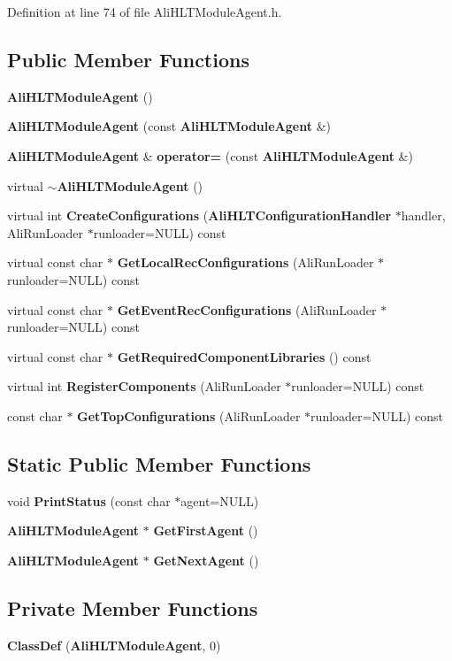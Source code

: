 Definition at line 74 of file Ali\-HLTModule\-Agent.h.\subsection*{Public Member Functions}
\begin{CompactItemize}
\item 
{\bf Ali\-HLTModule\-Agent} ()
\item 
{\bf Ali\-HLTModule\-Agent} (const {\bf Ali\-HLTModule\-Agent} \&)
\item 
{\bf Ali\-HLTModule\-Agent} \& {\bf operator=} (const {\bf Ali\-HLTModule\-Agent} \&)
\item 
virtual {\bf $\sim$Ali\-HLTModule\-Agent} ()
\item 
virtual int {\bf Create\-Configurations} ({\bf Ali\-HLTConfiguration\-Handler} $\ast$handler, Ali\-Run\-Loader $\ast$runloader=NULL) const 
\item 
virtual const char $\ast$ {\bf Get\-Local\-Rec\-Configurations} (Ali\-Run\-Loader $\ast$runloader=NULL) const 
\item 
virtual const char $\ast$ {\bf Get\-Event\-Rec\-Configurations} (Ali\-Run\-Loader $\ast$runloader=NULL) const 
\item 
virtual const char $\ast$ {\bf Get\-Required\-Component\-Libraries} () const 
\item 
virtual int {\bf Register\-Components} (Ali\-Run\-Loader $\ast$runloader=NULL) const 
\item 
const char $\ast$ {\bf Get\-Top\-Configurations} (Ali\-Run\-Loader $\ast$runloader=NULL) const 
\end{CompactItemize}
\subsection*{Static Public Member Functions}
\begin{CompactItemize}
\item 
void {\bf Print\-Status} (const char $\ast$agent=NULL)
\item 
{\bf Ali\-HLTModule\-Agent} $\ast$ {\bf Get\-First\-Agent} ()
\item 
{\bf Ali\-HLTModule\-Agent} $\ast$ {\bf Get\-Next\-Agent} ()
\end{CompactItemize}
\subsection*{Private Member Functions}
\begin{CompactItemize}
\item 
{\bf Class\-Def} ({\bf Ali\-HLTModule\-Agent}, 0)
\end{CompactItemize}
